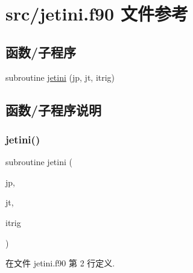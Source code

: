 \hypertarget{jetini_8f90}{}\section{src/jetini.f90 文件参考}
\label{jetini_8f90}
\subsection*{函数/子程序}
\begin{DoxyCompactItemize}
\item 
subroutine \mbox{\hyperlink{jetini_8f90_aa55c39927d50ee6b6b1d03a82585ca78}{jetini}} (jp, jt, itrig)
\end{DoxyCompactItemize}


\subsection{函数/子程序说明}
\mbox{\label{jetini_8f90_aa55c39927d50ee6b6b1d03a82585ca78}} 
\subsubsection{\texorpdfstring{jetini()}{jetini()}}
{\footnotesize\ttfamily subroutine jetini (\begin{DoxyParamCaption}\item[{}]{jp,  }\item[{}]{jt,  }\item[{}]{itrig }\end{DoxyParamCaption})}



在文件 jetini.\+f90 第 2 行定义.

